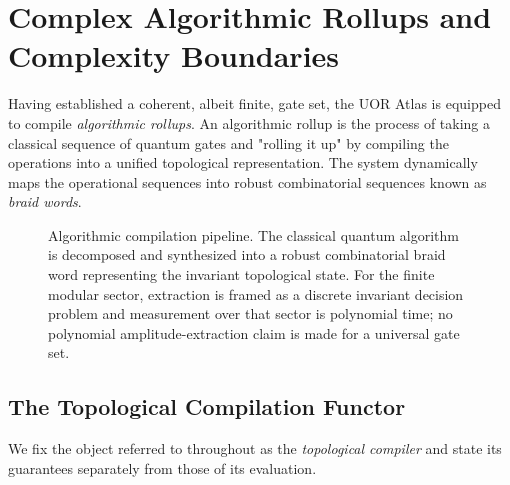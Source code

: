 \section{Complex Algorithmic Rollups and Complexity Boundaries}

Having established a coherent, albeit finite, gate set, the UOR Atlas is equipped to compile \textit{algorithmic rollups}. An algorithmic rollup is the process of taking a classical sequence of quantum gates and "rolling it up" by compiling the operations into a unified topological representation. The system dynamically maps the operational sequences into robust combinatorial sequences known as \textit{braid words}. 

\begin{figure}[h]
\centering
{}
\caption{Algorithmic compilation pipeline. The classical quantum algorithm is decomposed and synthesized into a robust combinatorial braid word representing the invariant topological state. For the finite modular sector, extraction is framed as a discrete invariant decision problem and measurement over that sector is polynomial time; no polynomial amplitude-extraction claim is made for a universal gate set.}
\label{fig:compilation}
\end{figure}

\subsection{The Topological Compilation Functor}
\label{sec:compiler_def}
We fix the object referred to throughout as the \emph{topological compiler} and state its guarantees separately from those of its evaluation.

